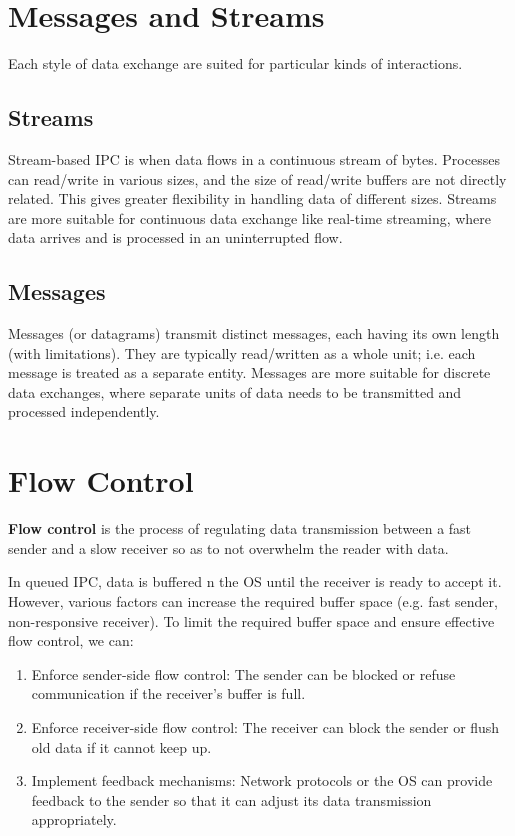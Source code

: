 \documentclass{report}
\newcommand{\definitionBegin}[1]{\begin{tcolorbox}[title={Definition: #1}]}
\newcommand{\definitionEnd}{\end{tcolorbox}}
\begin{document}
\section{Messages and Streams}
Each style of data exchange are suited for particular kinds of interactions.

\subsection{Streams}
Stream-based IPC is when data flows in a continuous stream of bytes. Processes can read/write in
various sizes, and the size of read/write buffers are not directly related. This gives greater
flexibility in handling data of different sizes. Streams are more suitable for continuous data
exchange like real-time streaming, where data arrives and is processed in an uninterrupted flow.


\subsection{Messages}
Messages (or datagrams) transmit distinct messages, each having its own length (with
limitations). They are typically read/written as a whole unit; i.e. each message is treated as a
separate entity. Messages are more suitable for discrete data exchanges, where separate units of
data needs to be transmitted and processed independently.


\section{Flow Control}
\definitionBegin{Flow Control}
\textbf{Flow control} is the process of regulating data transmission between a fast sender and a
slow receiver so as to not overwhelm the reader with data.
\definitionEnd

In queued IPC, data is buffered n the OS until the receiver is ready to accept it. However, various
factors can increase the required buffer space (e.g. fast sender, non-responsive receiver). To limit
the required buffer space and ensure effective flow control, we can:
\begin{enumerate}[label=\textit{(\roman*)}]
\item Enforce sender-side flow control: The sender can be blocked or refuse communication if the
  receiver's buffer is full.
\item Enforce receiver-side flow control: The receiver can block the sender or flush old data if it
  cannot keep up.
\item Implement feedback mechanisms: Network protocols or the OS can provide feedback to the sender
  so that it can adjust its data transmission appropriately.
\end{enumerate}
\end{document}
